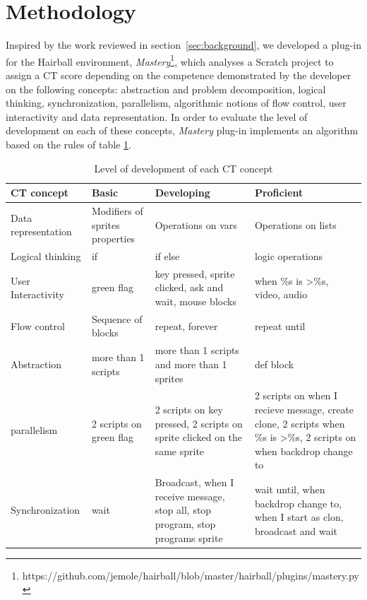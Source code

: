 \documentclass[a4paper,11pt]{article}
\begin{document}
\section{Methodology}
\label{sec:methodology}
Inspired by the work reviewed in section~\ref{sec:background}, we developed a plug-in for the Hairball environment, \textit{Mastery}\footnote{https://github.com/jemole/hairball/blob/master/hairball/plugins/mastery.py}, which analyses a Scratch project to assign a CT score depending on the competence demonstrated by the developer on the following concepts: abstraction and problem decomposition, logical thinking, synchronization, parallelism, algorithmic notions of flow control, user interactivity and data representation. In order to evaluate the level of development on each of these concepts, \textit{Mastery} plug-in implements an algorithm based on the rules of table \ref{table:CTscore}.
\begin{table}[t]
\centering
\caption{Level of development of each CT concept}
\begin{tabular}{p{2.5cm}p{2.7cm}p{3cm}p{4cm}}
\toprule
CT concept & Basic & Developing & Proficient\\ \midrule 
Data representation & Modifiers of sprites properties &
Operations on vars & Operations on lists  \\
Logical thinking & if & if else & logic operations \\ 
User Interactivity & green flag & key pressed, sprite clicked, ask and wait,
mouse blocks & when \%s is \textgreater \%s, video, audio \\ 
Flow control & Sequence of blocks & repeat, forever & repeat until \\ 
Abstraction & more than 1 scripts & more than 1 scripts and more than 1 sprites & def block\\ parallelism & 2 scripts on green flag & 2 scripts on key pressed, 2 scripts on sprite clicked on the same sprite & 2 scripts on when I recieve message, create clone, 2 scripts when \%s is \textgreater \%s, 2 scripts on when backdrop change to \\
Synchronization & wait & Broadcast, when I receive message, stop all, stop program, stop programs sprite & wait until, when backdrop change to, when I start as clon, broadcast and wait \\ \bottomrule
\end{tabular}
\label{table:CTscore}
\end{table}
\end{document}

